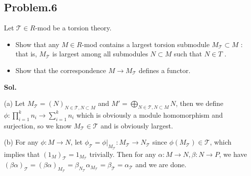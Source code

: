 \documentclass[lang=en,11pt,a4paper,citestyle =authoryear]{elegantpaper}
\begin{document}
\subsection*{Problem.6} 
Let $\mathcal{T} \in R$-mod be a torsion theory.\par
\begin{itemize}
    \item Show that any $M \in R$-mod contains a largest torsion submodule
$M_{\mathcal{T}} \subset M$ : that is, $M_{\mathcal{T}}$ is largest among all submodules $N \subset M$ such that $N \in T$ .
    \item Show that the correspondence $M\to M_{\mathcal{T}}$ defines a functor.
\end{itemize}
\vspace{0.5em}\par
\textbf{Sol.} \par
    (a) Let $M_{\mathcal{T}} = (N)_{N\in \mathcal{T}, N\subset M}$ and $M' = \bigoplus_{N\in \mathcal{T}, N\subset M} N$, then we define $\phi:\prod_{i=1}^k n_i\to \sum\limits_{i=1}^k n_i$ which is obviously a module homomorphism and surjection, so we know $M_{\mathcal{T}} \in \mathcal{T}$ and is obviously largest.\par
    (b) For any $\phi:M\to N$, let $\phi_{\mathcal{T}} = \phi|_{M_{\mathcal{T}}}: M_{\mathcal{T}} \to N_{\mathcal{T}}$ since $\phi(M_{\mathcal{T}}) \in \mathcal{T}$, which implies that $(1_M)_{\mathcal{T}} = 1_{M_{\mathcal{T}}}$ trivially. Then for any $\alpha:M\to N, \beta: N \to P$, we have $(\beta\alpha)_{\mathcal{T}} = (\beta\alpha)_{M_{\mathcal{T}}} = \beta_{N_{\mathcal{T}}}\alpha_{M_{\mathcal{T}}} = \beta_{\mathcal{T}} = \alpha_{\mathcal{T}}$ and we are done.
\par 
\vspace{0.5em}

\addappheadtotoc
\end{document}

